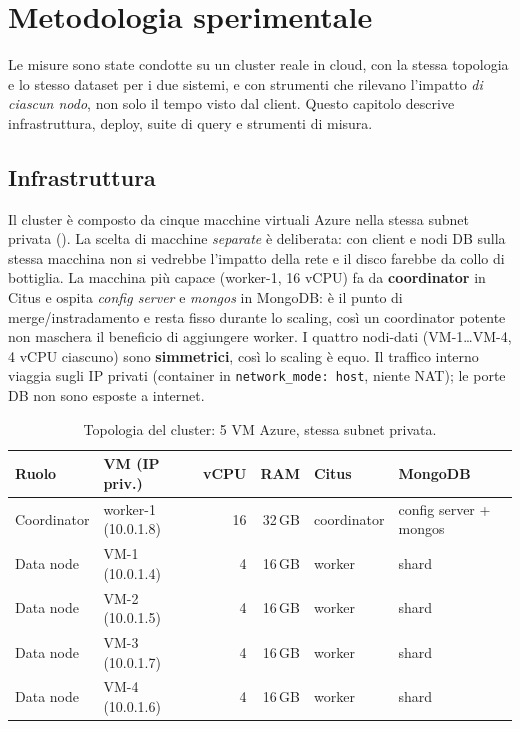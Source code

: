 \chapter{Metodologia sperimentale}
\label{ch:metodologia}

Le misure sono state condotte su un cluster reale in cloud, con la stessa topologia e lo stesso dataset per i
due sistemi, e con strumenti che rilevano l'impatto \emph{di ciascun nodo}, non solo il tempo visto dal
client. Questo capitolo descrive infrastruttura, deploy, suite di query e strumenti di misura.

\section{Infrastruttura}
\label{sec:infra}

Il cluster è composto da cinque macchine virtuali Azure nella stessa subnet privata (). La
scelta di macchine \emph{separate} è deliberata: con client e nodi DB sulla stessa macchina non si vedrebbe
l'impatto della rete e il disco farebbe da collo di bottiglia. La macchina più capace (worker-1, 16 vCPU)
fa da \textbf{coordinator} in Citus e ospita \emph{config server} e \emph{mongos} in MongoDB: è il punto di
merge/instradamento e resta fisso durante lo scaling, così un coordinator potente non maschera il beneficio
di aggiungere worker. I quattro nodi-dati (VM-1\dots VM-4, 4 vCPU ciascuno) sono \textbf{simmetrici}, così lo
scaling è equo. Il traffico interno viaggia sugli IP privati (container in \texttt{network\_mode: host},
niente NAT); le porte DB non sono esposte a internet.

\begin{table}[htbp]
  \centering
  \caption{Topologia del cluster: 5 VM Azure, stessa subnet privata.}
  \label{tab:vm}
  \begin{tabular}{llrrll}
    \toprule
    \textbf{Ruolo} & \textbf{VM (IP priv.)} & \textbf{vCPU} & \textbf{RAM} & \textbf{Citus} & \textbf{MongoDB} \\
    \midrule
    Coordinator & worker-1 (10.0.1.8) & 16 & 32\,GB & coordinator & config server + mongos \\
    Data node   & VM-1 (10.0.1.4)     & 4  & 16\,GB & worker      & shard \\
    Data node   & VM-2 (10.0.1.5)     & 4  & 16\,GB & worker      & shard \\
    Data node   & VM-3 (10.0.1.7)     & 4  & 16\,GB & worker      & shard \\
    Data node   & VM-4 (10.0.1.6)     & 4  & 16\,GB & worker      & shard \\
    \bottomrule
  \end{tabular}
\end{table}

